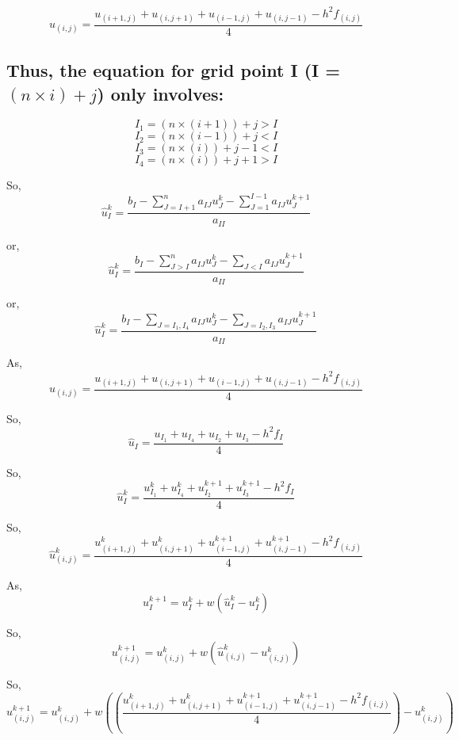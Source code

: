 \documentclass[11pt]{article}
\begin{document}
    \[u_{(i,j)} = \frac{u_{(i+1,j)} + u_{(i,j+1)} + u_{(i-1,j)} + u_{(i,j-1)} - h^2f_{(i,j)}}{4}\]

    \hypertarget{thus-the-equation-for-grid-point-i-i-ntimes-i-j-only-involves}{%
\subsection{\texorpdfstring{Thus, the equation for grid point I (I =
\((n\times i) + j\)) only
involves:}{Thus, the equation for grid point I (I = (n\textbackslash{}times i) + j) only involves:}}\label{thus-the-equation-for-grid-point-i-i-ntimes-i-j-only-involves}}

    \[I_1 = (n \times (i+1)) + j > I\] \[I_2 = (n \times (i-1)) + j < I\]
\[I_3 = (n \times (i)) + j - 1 < I\]
\[I_4 = (n \times (i)) + j + 1 > I\]

    So,
\[\hat{u}^{k}_{I} = \frac{b_I - \displaystyle \sum^{n}_{J=I+1} a_{IJ}u^k_{J} - \displaystyle \sum^{I-1}_{J=1} a_{IJ}u^{k+1}_{J}}{a_{II}}\]

    or,
\[\hat{u}^{k}_{I} = \frac{b_I - \displaystyle \sum^{n}_{J>I} a_{IJ}u^k_{J} - \displaystyle \sum_{J<I} a_{IJ}u^{k+1}_{J}}{a_{II}}\]

    or,
\[\hat{u}^{k}_{I} = \frac{b_I - \displaystyle \sum_{J=I_1,I_4} a_{IJ}u^k_{J} - \displaystyle \sum_{J=I_2,I_3} a_{IJ}u^{k+1}_{J}}{a_{II}}\]

    As,
\[u_{(i,j)} = \frac{u_{(i+1,j)} + u_{(i,j+1)} + u_{(i-1,j)} + u_{(i,j-1)} - h^2f_{(i,j)}}{4}\]

    So,
\[\hat{u}_{I} = \frac{u_{I_1} + u_{I_4} + u_{I_2} + u_{I_3} - h^2f_{I}}{4}\]

    So,
\[\hat{u}^{k}_{I} = \frac{u^{k}_{I_1} + u^{k}_{I_4} + u^{k+1}_{I_2} + u^{k+1}_{I_3} - h^2f_{I}}{4}\]

    So,
\[\hat{u}^{k}_{(i,j)} = \frac{u^k_{(i+1,j)} + u^k_{(i,j+1)} + u^{k+1}_{(i-1,j)} + u^{k+1}_{(i,j-1)} - h^2f_{(i,j)}}{4}\]

    As, \[u^{k+1}_{I} = u^{k}_{I} + w(\hat{u}^{k}_{I} - u^{k}_{I})\]

    So,
\[u^{k+1}_{(i,j)} = u^{k}_{(i,j)} + w(\hat{u}^{k}_{(i,j)} - u^{k}_{(i,j)})\]

    So,
\[u^{k+1}_{(i,j)} = u^{k}_{(i,j)} + w\left(\left(\frac{u^k_{(i+1,j)} + u^k_{(i,j+1)} + u^{k+1}_{(i-1,j)} + u^{k+1}_{(i,j-1)} - h^2f_{(i,j)}}{4}\right) - u^{k}_{(i,j)}\right)\]
\end{document}
